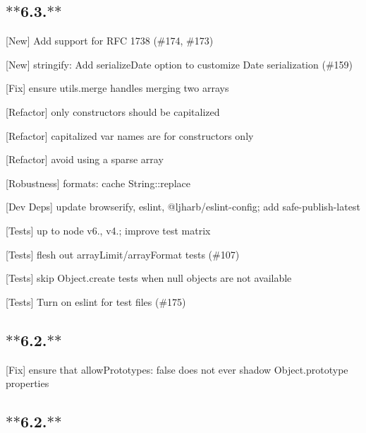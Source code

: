 \subsection*{$\ast$$\ast$6.3.$\ast$$\ast$}


\begin{DoxyItemize}
\item \mbox{[}New\mbox{]} Add support for R\+FC 1738 (\#174, \#173)
\item \mbox{[}New\mbox{]} {\ttfamily stringify}\+: Add {\ttfamily serialize\+Date} option to customize Date serialization (\#159)
\item \mbox{[}Fix\mbox{]} ensure {\ttfamily utils.\+merge} handles merging two arrays
\item \mbox{[}Refactor\mbox{]} only constructors should be capitalized
\item \mbox{[}Refactor\mbox{]} capitalized var names are for constructors only
\item \mbox{[}Refactor\mbox{]} avoid using a sparse array
\item \mbox{[}Robustness\mbox{]} {\ttfamily formats}\+: cache {\ttfamily String\+::replace}
\item \mbox{[}Dev Deps\mbox{]} update {\ttfamily browserify}, {\ttfamily eslint}, {\ttfamily @ljharb/eslint-\/config}; add {\ttfamily safe-\/publish-\/latest}
\item \mbox{[}Tests\mbox{]} up to {\ttfamily node} {\ttfamily v6.}, {\ttfamily v4.}; improve test matrix
\item \mbox{[}Tests\mbox{]} flesh out array\+Limit/array\+Format tests (\#107)
\item \mbox{[}Tests\mbox{]} skip Object.\+create tests when null objects are not available
\item \mbox{[}Tests\mbox{]} Turn on eslint for test files (\#175)
\end{DoxyItemize}

\subsection*{$\ast$$\ast$6.2.$\ast$$\ast$}


\begin{DoxyItemize}
\item \mbox{[}Fix\mbox{]} ensure that {\ttfamily allow\+Prototypes\+: false} does not ever shadow Object.\+prototype properties
\end{DoxyItemize}

\subsection*{$\ast$$\ast$6.2.$\ast$$\ast$}


